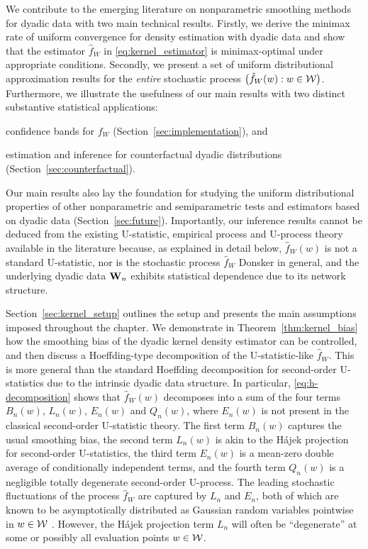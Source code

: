 We contribute to the emerging literature on nonparametric smoothing methods for
dyadic data with two main technical results. Firstly, we derive the minimax
rate of uniform convergence for density estimation with dyadic data and show
that the estimator $\hat{f}_W$ in \eqref{eq:kernel_estimator} is
minimax-optimal under appropriate conditions. Secondly, we present a set of
uniform distributional approximation results for the \emph{entire} stochastic
process $\big(\hat{f}_W(w):w\in\mathcal{W}\big)$. Furthermore, we illustrate the
usefulness of our main results with two distinct substantive statistical
applications:
%
\begin{inlineroman}
  \item
    confidence bands for $f_W$ (Section~\ref{sec:implementation}), and
  \item
    estimation and inference for counterfactual
    dyadic distributions (Section~\ref{sec:counterfactual}).
\end{inlineroman}
%
Our main results also lay the foundation for studying the uniform
distributional properties of other nonparametric and semiparametric tests and
estimators based on dyadic data (Section~\ref{sec:future}). Importantly, our
inference results cannot be deduced from the existing U-statistic, empirical
process and U-process theory available in the literature
\citep{van1996weak,gine2021mathematical} because, as explained in detail below,
$\hat{f}_W(w)$ is not a standard U-statistic, nor is the stochastic process
$\hat{f}_W$ Donsker in general, and the underlying dyadic data $\mathbf{W}_n$ exhibits
statistical dependence due to its network structure.

Section~\ref{sec:kernel_setup} outlines the setup and presents the main
assumptions imposed throughout the chapter. We demonstrate in
Theorem~\ref{thm:kernel_bias} how the smoothing bias of the dyadic kernel
density estimator can be controlled, and then discuss a Hoeffding-type
decomposition of the U-statistic-like $\hat{f}_W$. This is more general than
the standard Hoeffding decomposition for second-order U-statistics due to the
intrinsic dyadic data structure. In particular, \eqref{eq:h-decomposition}
shows that $\hat{f}_W(w)$ decomposes into a sum of the four terms $B_n(w)$,
$L_n(w)$, $E_n(w)$ and $Q_n(w)$, where $E_n(w)$ is not present in the classical
second-order U-statistic theory. The first term $B_n(w)$ captures the usual
smoothing bias, the second term $L_n(w)$ is akin to the H{\'a}jek projection
for second-order U-statistics, the third term $E_n(w)$ is a mean-zero double
average of conditionally independent terms, and the fourth term $Q_n(w)$ is a
negligible totally degenerate second-order U-process. The leading stochastic
fluctuations of the process $\hat{f}_W$ are captured by $L_n$ and $E_n$, both
of which are known to be asymptotically distributed as Gaussian random
variables pointwise in $w\in\mathcal{W}$ \citep{graham2022kernel}. However, the
H{\'a}jek projection term $L_n$ will often be ``degenerate'' at some or
possibly all evaluation points $w\in\mathcal{W}$.

